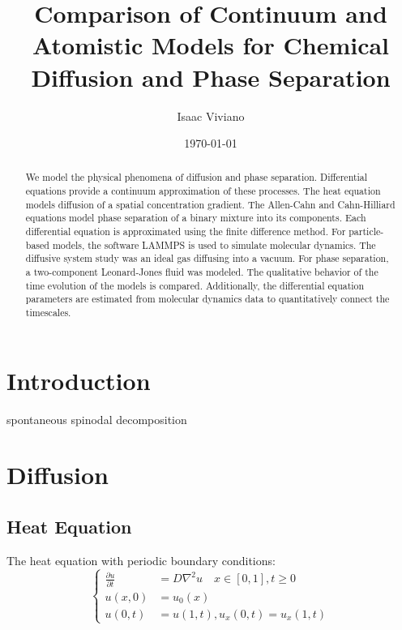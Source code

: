 \documentclass[12pt, reqno]{article}
\theoremstyle{definition}
\theoremstyle{remark}
\begin{document}
\title{Comparison of Continuum and Atomistic Models for Chemical Diffusion and Phase Separation}
\date{\today}
\author{Isaac Viviano}

\maketitle

\begin{abstract}

    We model the physical phenomena of diffusion and phase separation. Differential equations provide a continuum approximation of these processes. The heat equation models diffusion of a spatial concentration gradient. The Allen-Cahn and Cahn-Hilliard equations model phase separation of a binary mixture into its components. Each differential equation is approximated using the finite difference method. For particle-based models, the software LAMMPS is used to simulate molecular dynamics. The diffusive system study was an ideal gas diffusing into a vacuum. For phase separation, a two-component Leonard-Jones fluid was modeled. The qualitative behavior of the time evolution of the models is compared. Additionally, the differential equation parameters are estimated from molecular dynamics data to quantitatively connect the timescales.


\end{abstract}

\tableofcontents

\section{Introduction} \label{sec_intro}

spontaneous spinodal decomposition 

\section{Diffusion} \label{sec_intro}

\subsection{Heat Equation} \label{ssec_heat}

The heat equation with periodic boundary conditions:
\begin{equation} \label{eq_heat_de_1D}
    \left\{
    \begin{split}
        \frac{\partial u}{\partial t}&=D\nabla^2u\quad x\in[0,1],t\ge0\\
        u(x,0)&=u_0(x)\\
        u(0,t)&=u(1,t), u_x(0,t)=u_x(1,t)
    \end{split}
    \right.
\end{equation}
\end{document}
